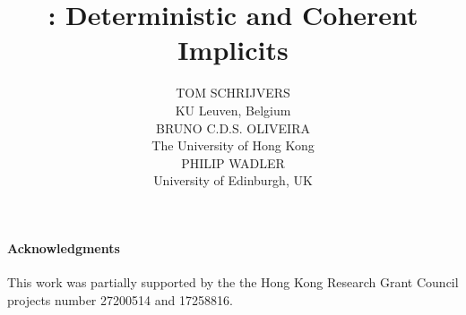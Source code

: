 \documentclass{jfp1}
\title[Cochis: Deterministic and Coherent Implicits]{\name: Deterministic and Coherent Implicits}
\author[T. Schrijvers, B. Oliveira and P. Wadler]
       {TOM SCHRIJVERS \\
        KU Leuven, Belgium \\
        BRUNO C.D.S. OLIVEIRA \\
        The University of Hong Kong \\
        PHILIP WADLER \\ 
        University of Edinburgh, UK
}
\begin{document}
\maketitle

\begin{abstract}

\end{abstract}












%






\paragraph{Acknowledgments}
This work was
partially supported by the the Hong Kong Research Grant Council
projects number 27200514 and 17258816.

\newpage


\newpage
\appendix




\end{document}
